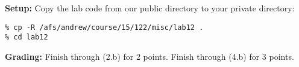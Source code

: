 \documentclass[lab]{inc/122handout}
\begin{document}
\labcollab

\textbf{Setup:} Copy the lab code from our public directory to your private
directory:

\begin{lstlisting}[language={[coin]C}]
% cd private/15122
% cp -R /afs/andrew/course/15/122/misc/lab12 .
% cd lab12
\end{lstlisting}

\textbf{Grading:} Finish through (2.b) for 2 points.  Finish through
(4.b) for 3 points.


%
%
\end{document}
